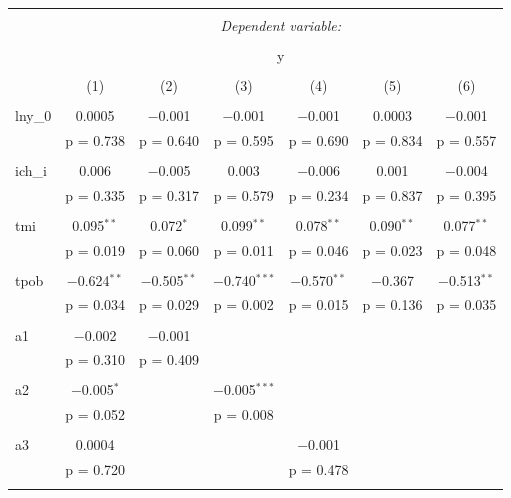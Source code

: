\begin{table}[!htbp] \centering 
    \tiny
  \caption{} 
  \label{} 
\begin{tabular}{@{\extracolsep{5pt}}lcccccc} 
\\[-1.8ex]\hline 
\hline \\[-1.8ex] 
 & \multicolumn{6}{c}{\textit{Dependent variable:}} \\ 
\cline{2-7} 
\\[-1.8ex] & \multicolumn{6}{c}{y} \\ 
\\[-1.8ex] & (1) & (2) &  (3) & (4) & (5) & (6)\\ 
\hline \\[-1.8ex] 
 lny\_0 & 0.0005 & $-$0.001 & $-$0.001 & $-$0.001 & 0.0003 & $-$0.001 \\ 
  & p = 0.738 & p = 0.640 & p = 0.595 & p = 0.690 & p = 0.834 & p = 0.557 \\ 
  & & & & & & \\ 
 ich\_i & 0.006 & $-$0.005 & 0.003 & $-$0.006 & 0.001 & $-$0.004 \\ 
  & p = 0.335 & p = 0.317 & p = 0.579 & p = 0.234 & p = 0.837 & p = 0.395 \\ 
  & & & & & & \\ 
 tmi & 0.095$^{**}$ & 0.072$^{*}$ & 0.099$^{**}$ & 0.078$^{**}$ & 0.090$^{**}$ & 0.077$^{**}$ \\ 
  & p = 0.019 & p = 0.060 & p = 0.011 & p = 0.046 & p = 0.023 & p = 0.048 \\ 
  & & & & & & \\ 
 tpob & $-$0.624$^{**}$ & $-$0.505$^{**}$ & $-$0.740$^{***}$ & $-$0.570$^{**}$ & $-$0.367 & $-$0.513$^{**}$ \\ 
  & p = 0.034 & p = 0.029 & p = 0.002 & p = 0.015 & p = 0.136 & p = 0.035 \\ 
  & & & & & & \\ 
 a1 & $-$0.002 & $-$0.001 &  &  &  &  \\ 
  & p = 0.310 & p = 0.409 &  &  &  &  \\ 
  & & & & & & \\ 
 a2 & $-$0.005$^{*}$ &  & $-$0.005$^{***}$ &  &  &  \\ 
  & p = 0.052 &  & p = 0.008 &  &  &  \\ 
  & & & & & & \\ 
 a3 & 0.0004 &  &  & $-$0.001 &  &  \\ 
  & p = 0.720 &  &  & p = 0.478 &  &  \\ 
  & & & & & & \\ 

\end{tabular}
\end{table}
